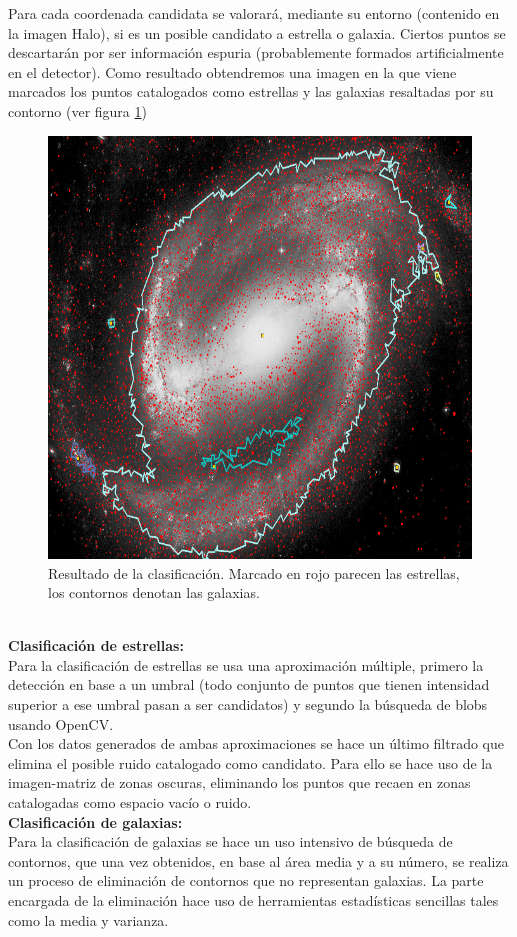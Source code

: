 	Para cada coordenada candidata se valorará, mediante su entorno (contenido en la imagen {\scriptsize Halo}), si es un posible candidato a estrella o galaxia. Ciertos puntos se descartarán por ser información espuria (probablemente formados artificialmente en el detector).
	Como resultado obtendremos una imagen en la que viene marcados los puntos catalogados como estrellas y las galaxias resaltadas por su contorno (ver figura \ref{fig:estrellasContornos})
	\begin{figure}[!htb]
		\centering
		\includegraphics[width=1\textwidth]{images/vectorClasifica.png}
		\caption{\label{fig:estrellasContornos}{\small Resultado de la clasificación. Marcado en rojo parecen las estrellas, los contornos denotan las galaxias.}}
	\end{figure}
	\\
	\textbf{Clasificación de estrellas:}
	\\Para la clasificación de estrellas se usa una aproximación múltiple, primero la detección en base a un umbral (todo conjunto de puntos que tienen intensidad superior a ese umbral pasan a ser candidatos) y segundo la búsqueda de blobs usando OpenCV.\\
	Con los datos generados de ambas aproximaciones se hace un último filtrado que elimina el posible ruido catalogado como candidato. Para ello se hace uso de la imagen-matriz de zonas oscuras, eliminando los puntos que recaen en zonas catalogadas como espacio vacío o ruido.
	\\
	\textbf{Clasificación de galaxias:}\\
	Para la clasificación de galaxias se hace un uso intensivo de búsqueda de contornos, que una vez obtenidos, en base al área media y a su número, se realiza un proceso de eliminación de contornos que no representan galaxias. La parte encargada de la eliminación hace uso de herramientas estadísticas sencillas tales como la media y varianza.
	\\
	\clearpage
	\newpage
